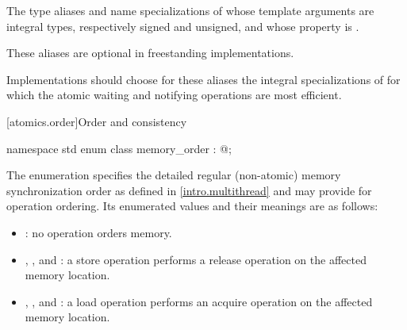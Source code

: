 \pnum
{}%
%
The type aliases
 and 
name specializations of 
whose template arguments are integral types, respectively signed and unsigned,
and whose  property is .
\begin{note}
%
These aliases are optional in freestanding implementations.
\end{note}
Implementations should choose for these aliases
the integral specializations of 
for which the atomic waiting and notifying operations
are most efficient.

[atomics.order]{Order and consistency}
%
%
%
%
%
%
%
%
%
%
%

\begin{codeblock}
namespace std {
  enum class memory_order : @;
}
\end{codeblock}

\pnum
The enumeration  specifies the detailed regular
(non-atomic) memory synchronization order as defined in
\ref{intro.multithread} and may provide for operation ordering. Its
enumerated values and their meanings are as follows:

\begin{itemize}
\item {}: no operation orders memory.

\item {}, , and
: a store operation performs a release operation on the
affected memory location.

\item {}, , and
: a load operation performs an acquire operation on the
affected memory location.
\end{itemize}

